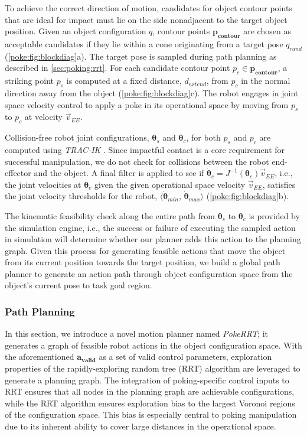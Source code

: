To achieve the correct direction of motion, candidates for object contour points that are ideal for impact must lie on the side nonadjacent to the target object position. Given an object configuration $q$, contour points $\boldsymbol{p_{contour}}$ are chosen as acceptable candidates if they lie within a cone originating from a target pose $q_{rand}$ (\cref{poke:fig:blockdiag}a). The target pose is sampled during path planning as described in \cref{sec:poking:rrt}.
For each candidate contour point $p_c \in \boldsymbol{p_{contour}}$, a striking point $p_s$ is computed at a fixed distance, $d_{extend}$, from $p_c$ in the normal direction away from the object (\cref{poke:fig:blockdiag}c). The robot engages in joint space velocity control to apply a poke in its operational space by moving from $p_s$ to $p_c$ at velocity $\vec{v}_{EE}$.

Collision-free robot joint configurations, $\boldsymbol{\theta}_s$ and $\boldsymbol{\theta}_c$, for both $p_s$ and $p_c$ are computed using \textsl{TRAC-IK} \cite{7363472}. Since impactful contact is a core requirement for successful manipulation, we do not check for collisions between the robot end-effector and the object.
A final filter is applied to see if $\boldsymbol{\dot{\theta}}_c = J^{-1}(\boldsymbol{\theta}_c)\vec{v}_{EE}$, i.e., the joint velocities at $\boldsymbol{\theta}_c$ given the given operational space velocity $\vec{v}_{EE}$, satisfies the joint velocity thresholds for the robot, $\langle\boldsymbol{\dot{\theta}}_{min}$, $\boldsymbol{\dot{\theta}}_{max}\rangle$ (\cref{poke:fig:blockdiag}b).

The kinematic feasibility check along the entire path from $\boldsymbol{\theta}_s$ to $\boldsymbol{\theta}_c$ is provided by the simulation engine, i.e., the success or failure of executing the sampled action in simulation will determine whether our planner adds this action to the planning graph.
Given this process for generating feasible actions that move the object from its current position towards the target position, we build a global path planner to generate an action path through object configuration space from the object's current pose to task goal region.

\subsubsection{Path Planning}
\label{sec:poking:planners}

In this section, we introduce a novel motion planner named \textsl{PokeRRT}; it generates a graph of feasible robot actions in the object configuration space.
With the aforementioned $\boldsymbol{a_{valid}}$ as a set of valid control parameters, exploration properties of the rapidly-exploring random tree (RRT) algorithm \cite{lavalle1998rapidly} are leveraged to generate a planning graph. The integration of poking-specific control inputs to RRT ensures that all nodes in the planning graph are achievable configurations, while the RRT algorithm ensures exploration bias to the largest Voronoi regions of the configuration space. This bias is especially central to poking manipulation due to its inherent ability to cover large distances in the operational space.

